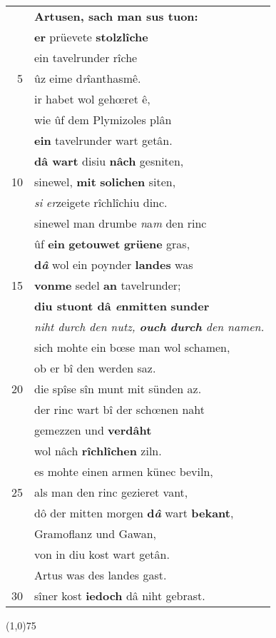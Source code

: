 \documentclass[8pt,a4paper,notitlepage]{article}
\begin{document}
\begin{table}[ht]
\begin{minipage}[t]{0.5\linewidth}
\begin{tabular}{rl}
 & \textbf{Artusen, sach man sus tuon:}\\ 
 & \textbf{er} prüevete \textbf{stolzlîche}\\ 
 & ein tavelrunder rîche\\ 
5 & ûz eime d\textit{r}îanthasmê.\\ 
 & ir habet wol gehœret ê,\\ 
 & wie ûf dem Plymizoles plân\\ 
 & \textbf{ein} tavelrunder wart getân.\\ 
 & \textbf{dâ wart} disiu \textbf{nâch} gesniten,\\ 
10 & sinewel, \textbf{mit} \textbf{solichen} siten,\\ 
 & \textit{si} \textit{er}zeigete rîchlîchiu dinc.\\ 
 & sinewel man drumbe \textit{n}a\textit{m} den rinc\\ 
 & ûf \textbf{ein} \textbf{getouwet} \textbf{grüene} gras,\\ 
 & \textbf{d\textit{â}} wol ein poynder \textbf{landes} was\\ 
15 & \textbf{vonme} sedel \textbf{an} tavelrunder;\\ 
 & \textbf{diu stuont dâ \textit{e}nmitten} \textbf{sunder}\\ 
 & \textit{niht durch den nutz, \textbf{ouch} \textbf{durch} den namen.}\\ 
 & sich mohte ein bœse man wol schamen,\\ 
 & ob er bî den werden saz.\\ 
20 & die spîse sîn munt mit sünden az.\\ 
 & der rinc wart bî der schœnen naht\\ 
 & gemezzen und \textbf{verdâht}\\ 
 & wol nâch \textbf{rîchlîchen} ziln.\\ 
 & es mohte einen armen künec beviln,\\ 
25 & als man den rinc gezieret vant,\\ 
 & dô der mitten morgen \textbf{d\textit{â}} wart \textbf{bekant},\\ 
 & Gramoflanz und Gawan,\\ 
 & von in diu kost wart getân.\\ 
 & Artus was des landes gast.\\ 
30 & sîner kost \textbf{iedoch} dâ niht gebrast.\\ 
\end{tabular}
\scriptsize
\line(1,0){75} \newline

\end{minipage}
\end{table}
\end{document}
